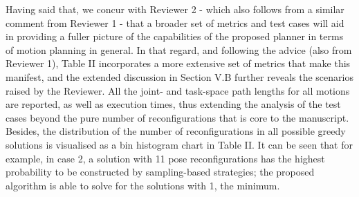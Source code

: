 \documentclass[11pt]{article}
\begin{document}
\begin{enumerate}[I.]
Having said that, we concur with Reviewer 2 - which also follows from a similar comment from Reviewer 1 - that a broader set of metrics and test cases will aid in providing a fuller 
picture of the capabilities of the proposed planner in terms of motion planning in general. %
In that regard, and following the advice (also from Reviewer 1), Table II incorporates a more extensive set of metrics that make this manifest, and the extended discussion in Section V.B further reveals the scenarios raised by the Reviewer. All the joint- and task-space path lengths for all motions are reported, as well as execution times, thus extending the analysis of the test cases beyond the pure number of reconfigurations that is core to the manuscript. 
Besides, the distribution of the number of reconfigurations in all possible greedy solutions is visualised as a bin histogram chart in Table II. It can be seen that for example, in case 2, a solution with 11 pose reconfigurations has the highest probability to be constructed by sampling-based strategies; the proposed algorithm is able to solve for the solutions with 1, the minimum.

\begin{comment}
\textcolor{red}{TO BE REMOVED: (T) I'm not sure whether the histogram should be referred as ``empirical", both here and in the paper: For each test case, I calculated the number of reconfigurations of all greedy solutions and build the histogram, instead of randomly choosing 100 cases among them. (J) It is empirical in that that it is exactly how youu have constructed the distribution, and we don't provide the real underlying distributon, but the histogram of cases, which is by definition the empirical distribution. I'm being a bit pedantic here to be as accurate as possible, but bottom line is we don't have a the continuous, real distribution of the variable "lift-offs" - that we could draw from the histogram, but we don't; what we have is the empirical distribution, which is a histogram of their discrete values.
(T) I think the distribution is precise and we should remove ``empirical". I counted the lift-offs for all 6084964 greedy solutions, and drew the histrogram. The distribution of "lift-offs" number is discrete, 2 or 3 or ..., impossible to have a motion with 2.5 lift-offs. So the distributions are exactly the ones shown in the paper. (J) Agree}
\end{comment}  



\end{enumerate}
\end{document}
